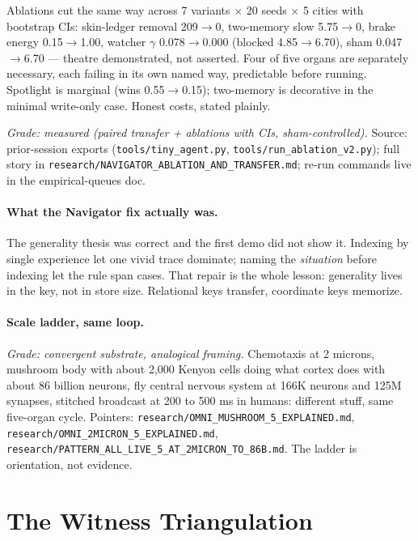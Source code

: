 Ablations cut the same way across 7 variants $\times$ 20 seeds $\times$ 5 cities with bootstrap CIs: skin-ledger removal 209$\to$0, two-memory slow 5.75$\to$0, brake energy 0.15$\to$1.00, watcher $\gamma$ 0.078$\to$0.000 (blocked 4.85$\to$6.70), sham 0.047$\to$6.70 --- theatre demonstrated, not asserted. Four of five organs are separately necessary, each failing in its own named way, predictable before running. Spotlight is marginal (wins 0.55$\to$0.15); two-memory is decorative in the minimal write-only case. Honest costs, stated plainly.

\textit{Grade: measured (paired transfer + ablations with CIs, sham-controlled).} Source: prior-session exports (\texttt{tools/tiny\_agent.py}, \texttt{tools/run\_ablation\_v2.py}); full story in \texttt{research/NAVIGATOR\_ABLATION\_AND\_TRANSFER.md}; re-run commands live in the empirical-queues doc.

\paragraph{What the Navigator fix actually was.} The generality thesis was correct and the first demo did not show it. Indexing by single experience let one vivid trace dominate; naming the \textit{situation} before indexing let the rule span cases. That repair is the whole lesson: generality lives in the key, not in store size. Relational keys transfer, coordinate keys memorize.

\paragraph{Scale ladder, same loop.} \textit{Grade: convergent substrate, analogical framing.} Chemotaxis at 2 microns, mushroom body with about 2,000 Kenyon cells doing what cortex does with about 86 billion neurons, fly central nervous system at 166K neurons and 125M synapses, stitched broadcast at 200 to 500 ms in humans: different stuff, same five-organ cycle. Pointers: \texttt{research/OMNI\_MUSHROOM\_5\_EXPLAINED.md}, \texttt{research/OMNI\_2MICRON\_5\_EXPLAINED.md}, \texttt{research/PATTERN\_ALL\_LIVE\_5\_AT\_2MICRON\_TO\_86B.md}. The ladder is orientation, not evidence.

\section{The Witness Triangulation}
\label{sec:ch09-witness}

